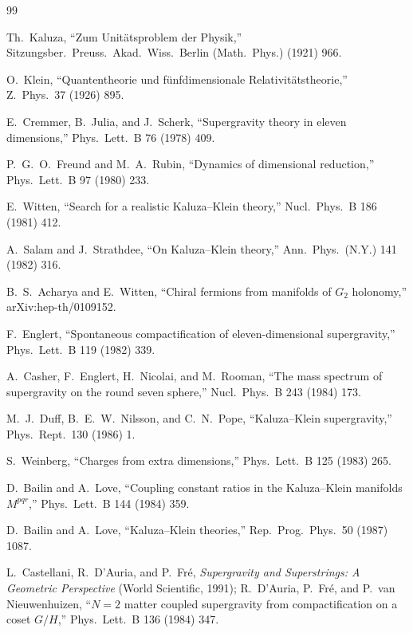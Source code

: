 \documentclass[11pt]{article}
\theoremstyle{plain}
\theoremstyle{definition}
\begin{document}
\begin{thebibliography}{99}

 Th.\ Kaluza, ``Zum Unit\"atsproblem der Physik,''
Sitzungsber.\ Preuss.\ Akad.\ Wiss.\ Berlin (Math.\ Phys.) (1921) 966.

 O.\ Klein, ``Quantentheorie und f\"unfdimensionale
Relativit\"atstheorie,'' Z.\ Phys.\ 37 (1926) 895.

 E.\ Cremmer, B.\ Julia, and J.\ Scherk,
``Supergravity theory in eleven dimensions,'' Phys.\ Lett.\ B 76 (1978) 409.

 P.\ G.\ O.\ Freund and M.\ A.\ Rubin,
``Dynamics of dimensional reduction,'' Phys.\ Lett.\ B 97 (1980) 233.

 E.\ Witten, ``Search for a realistic Kaluza--Klein
theory,'' Nucl.\ Phys.\ B 186 (1981) 412.

 A.\ Salam and J.\ Strathdee, ``On Kaluza--Klein
theory,'' Ann.\ Phys.\ (N.Y.) 141 (1982) 316.

 B.\ S.\ Acharya and E.\ Witten, ``Chiral fermions
from manifolds of $G_2$ holonomy,'' arXiv:hep-th/0109152.

 F.\ Englert, ``Spontaneous compactification of
eleven-dimensional supergravity,'' Phys.\ Lett.\ B 119 (1982) 339.

 A.\ Casher, F.\ Englert,
H.\ Nicolai, and M.\ Rooman, ``The mass spectrum of supergravity on the
round seven sphere,'' Nucl.\ Phys.\ B 243 (1984) 173.

 M.\ J.\ Duff, B.\ E.\ W.\ Nilsson, and
C.\ N.\ Pope, ``Kaluza--Klein supergravity,'' Phys.\ Rept.\ 130 (1986) 1.

 S.\ Weinberg, ``Charges from extra dimensions,''
Phys.\ Lett.\ B 125 (1983) 265.

 D.\ Bailin and A.\ Love, ``Coupling constant ratios
in the Kaluza--Klein manifolds $M^{pqr}$,'' Phys.\ Lett.\ B 144 (1984) 359.

 D.\ Bailin and A.\ Love, ``Kaluza--Klein theories,''
Rep.\ Prog.\ Phys.\ 50 (1987) 1087.

 L.\ Castellani, R.\ D'Auria, and P.\ Fr\'e,
\emph{Supergravity and Superstrings: A Geometric Perspective}
(World Scientific, 1991); R.\ D'Auria, P.\ Fr\'e, and P.\ van Nieuwenhuizen,
``$N=2$ matter coupled supergravity from compactification on a coset
$G/H$,'' Phys.\ Lett.\ B 136 (1984) 347.


\end{thebibliography}
\end{document}
